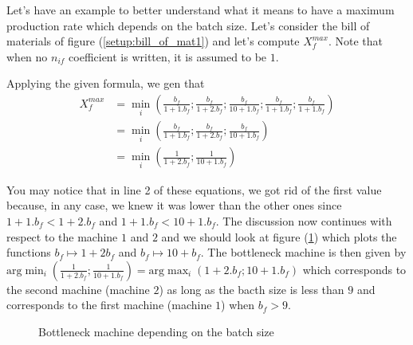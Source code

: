 Let's have an example to better understand what it means to have a maximum production rate which depends on the batch size. Let's consider the bill of materials of figure (\ref{setup:bill_of_mat1}) and let's compute $X_f^{max}$. Note that when no $n_{if}$ coefficient is written, it is assumed to be $1$. 

Applying the given formula, we gen that
\[
    \begin{split}
        X_f^{max} &= \min_i\left( \frac{b_f}{1+1.b_f} ; \frac{b_f}{1+2.b_f} ; \frac{b_f}{10 + 1.b_f} ; \frac{b_f}{1+1.b_f} ; \frac{b_f}{1 + 1.b_f} \right)\\
                  &= \min_i\left( \frac{b_f}{1+1.b_f} ; \frac{b_f}{1+2.b_f} ; \frac{b_f}{10 + 1.b_f} \right)\\
                  &= \min_i\left( \frac{1}{1+2.b_f} ; \frac{1}{10 + 1.b_f} \right)
    \end{split}
\]

You may notice that in line 2 of these equations, we got rid of the first value because, in any case, we knew it was lower than the other ones since $1+1.b_f<1+2.b_f$ and $1+1.b_f<10+1.b_f$. The discussion now continues with respect to the machine $1$ and $2$ and we should look at figure (\ref{setup:bottleneck_dependent}) which plots the functions $b_f\mapsto 1+2b_f$ and $b_f\mapsto 10+b_f$. The bottleneck machine is then given by $\textrm{arg}\min_i\left(\frac{1}{1+2.b_f} ; \frac{1}{10 + 1.b_f}\right) = \textrm{arg}\max_i(1+2.b_f ; 10 + 1.b_f)$ which corresponds to the second machine (machine $2$) as long as the bacth size is less than $9$ and corresponds to the first machine (machine $1$) when $b_f > 9$. 

\begin{figure}[h!]
    \centering
    \caption{\label{setup:bottleneck_dependent}Bottleneck machine depending on the batch size}
\end{figure}

